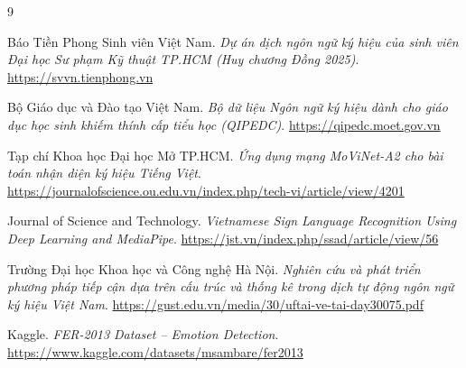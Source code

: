\begin{thebibliography}{9}

Báo Tiền Phong Sinh viên Việt Nam.
\textit{Dự án dịch ngôn ngữ ký hiệu của sinh viên Đại học Sư phạm Kỹ thuật TP.HCM (Huy chương Đồng 2025)}.
\url{https://svvn.tienphong.vn}

Bộ Giáo dục và Đào tạo Việt Nam.
\textit{Bộ dữ liệu Ngôn ngữ ký hiệu dành cho giáo dục học sinh khiếm thính cấp tiểu học (QIPEDC)}.
\url{https://qipedc.moet.gov.vn}

Tạp chí Khoa học Đại học Mở TP.HCM.
\textit{Ứng dụng mạng MoViNet-A2 cho bài toán nhận diện ký hiệu Tiếng Việt}.
\url{https://journalofscience.ou.edu.vn/index.php/tech-vi/article/view/4201}

Journal of Science and Technology.
\textit{Vietnamese Sign Language Recognition Using Deep Learning and MediaPipe}.
\url{https://jst.vn/index.php/ssad/article/view/56}

Trường Đại học Khoa học và Công nghệ Hà Nội.
\textit{Nghiên cứu và phát triển phương pháp tiếp cận dựa trên cấu trúc và thống kê trong dịch tự động ngôn ngữ ký hiệu Việt Nam}.
\url{https://gust.edu.vn/media/30/uftai-ve-tai-day30075.pdf}

Kaggle.
\textit{FER-2013 Dataset -- Emotion Detection}.
\url{https://www.kaggle.com/datasets/msambare/fer2013}

\end{thebibliography}
